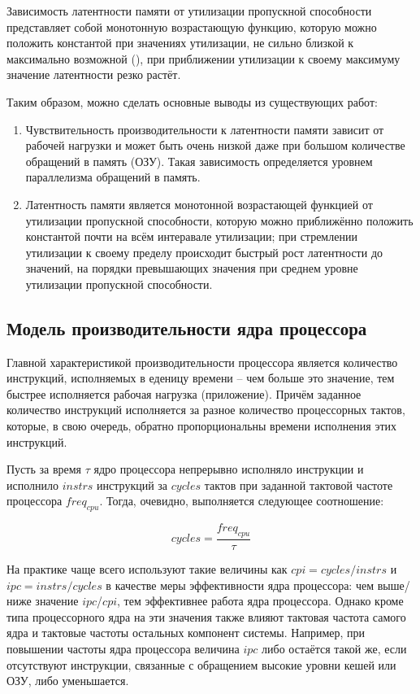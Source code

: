     Зависимость латентности памяти от утилизации пропускной способности представляет собой монотонную
    возрастающую функцию, которую можно положить константой при значениях утилизации, не сильно близкой
    к максимально возможной (\cite{david2011memory}), при приближении утилизации к своему максимуму
    значение латентности резко растёт.

    Таким образом, можно сделать основные выводы из существующих работ:
    \begin{enumerate}
        \item Чувствительность производительности к латентности памяти зависит от рабочей нагрузки и может
        быть очень низкой даже при большом количестве обращений в память (ОЗУ). Такая зависимость
        определяется уровнем параллелизма обращений в память.
        \item Латентность памяти является монотонной возрастающей функцией от утилизации пропускной
        способности, которую можно приближённо положить константой почти на всём интеравале утилизации;
        при стремлении утилизации к своему пределу происходит быстрый рост латентности до значений,
        на порядки превышающих значения при среднем уровне утилизации пропускной способности.
    \end{enumerate}

\subsection{Модель производительности ядра процессора} \label{model_chapter}

    Главной характеристикой производительности процессора является количество инструкций,
    исполняемых в еденицу времени -- чем больше это значение, тем быстрее исполняется рабочая
    нагрузка (приложение). Причём заданное количество инструкций исполняется за разное количество
    процессорных тактов, которые, в свою очередь, обратно пропорциональны времени исполнения
    этих инструкций.

    Пусть за время $\tau$ ядро процессора непрерывно исполняло инструкции и исполнило $instrs$
    инструкций за $cycles$ тактов при заданной тактовой частоте процессора $freq_{cpu}$.
    Тогда, очевидно, выполняется следующее соотношение:

    \begin{equation} \label{cycles_base}
        cycles = \frac{freq_{cpu}}{\tau}
    \end{equation}

    На практике чаще всего используют такие величины как $cpi = cycles / instrs$ и
    $ipc = instrs / cycles$ в качестве меры эффективности ядра процессора: чем выше/ниже значение
    $ipc$/$cpi$, тем эффективнее работа ядра процессора. Однако кроме типа процессорного ядра
    на эти значения также влияют тактовая частота самого ядра и тактовые частоты остальных компонент
    системы. Например, при повышении частоты ядра процессора величина $ipc$ либо остаётся такой же,
    если отсутствуют инструкции, связанные с обращением высокие уровни кешей или ОЗУ, либо уменьшается.

